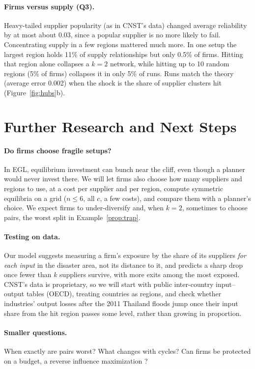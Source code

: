 \documentclass[10pt]{article}
\begin{document}
\paragraph{Firms versus supply (Q3).} Heavy-tailed supplier popularity (as in CNST's data) changed average reliability by at most about 0.03, since a popular supplier is no more likely to fail. Concentrating supply in a few regions mattered much more. In one setup the largest region holds 11\% of supply relationships but only 0.5\% of firms. Hitting that region alone collapses a $k=2$ network, while hitting up to 10 random regions (5\% of firms) collapses it in only 5\% of runs. Runs match the theory (average error 0.002) when the shock is the share of supplier clusters hit (Figure~\ref{fig:hubs}b).

\section{Further Research and Next Steps}
\paragraph{Do firms choose fragile setups?} In EGL, equilibrium investment can bunch near the cliff, even though a planner would never invest there. We will let firms also choose how many suppliers and regions to use, at a cost per supplier and per region, compute symmetric equilibria on a grid ($n\le6$, all $c$, a few costs), and compare them with a planner's choice. We expect firms to under-diversify and, when $k=2$, sometimes to choose pairs, the worst split in Example~\ref{prop:trap}.

\paragraph{Testing on data.} Our model suggests measuring a firm's exposure by the share of its suppliers \emph{for each input} in the disaster area, not its distance to it, and predicts a sharp drop once fewer than $k$ suppliers survive, with more exits among the most exposed. CNST's data is proprietary, so we will start with public inter-country input--output tables (OECD), treating countries as regions, and check whether industries' output losses after the 2011 Thailand floods jump once their input share from the hit region passes some level, rather than growing in proportion.

\paragraph{Smaller questions.} When exactly are pairs worst? What changes with cycles? Can firms be protected on a budget, a reverse influence maximization \cite{kempe2003}?
\end{document}
